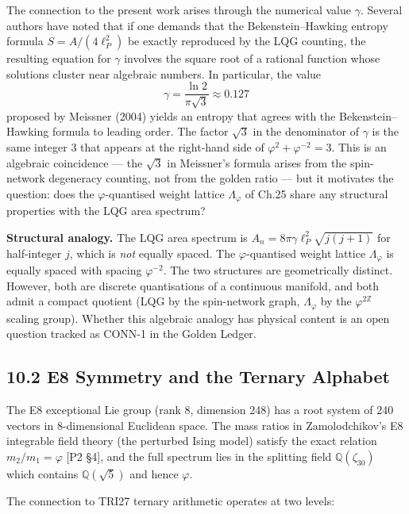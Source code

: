 The connection to the present work arises through the numerical value
$\gamma$. Several authors have noted that if one demands that the
Bekenstein--Hawking entropy formula $S = A/(4\ell_P^2)$ be exactly
reproduced by the LQG counting, the resulting equation for $\gamma$
involves the square root of a rational function whose solutions cluster
near algebraic numbers. In particular, the value
\[\gamma = \frac{\ln 2}{\pi\sqrt{3}} \approx 0.127\]
proposed by Meissner (2004) yields an entropy that agrees with the
Bekenstein--Hawking formula to leading order. The factor $\sqrt{3}$ in
the denominator of $\gamma$ is the same integer $3$ that appears at the
right-hand side of $\varphi^2 + \varphi^{-2} = 3$. This is an algebraic
coincidence --- the $\sqrt{3}$ in Meissner's formula arises from the
spin-network degeneracy counting, not from the golden ratio --- but it
motivates the question: does the $\varphi$-quantised weight lattice
$\Lambda_\varphi$ of Ch.25 share any structural properties with the LQG
area spectrum?

\textbf{Structural analogy.} The LQG area spectrum is
$A_n = 8\pi\gamma\ell_P^2 \sqrt{j(j+1)}$ for half-integer $j$, which
is \emph{not} equally spaced. The $\varphi$-quantised weight lattice
$\Lambda_\varphi$ is equally spaced with spacing $\varphi^{-2}$. The two
structures are geometrically distinct. However, both are discrete
quantisations of a continuous manifold, and both admit a compact quotient
(LQG by the spin-network graph, $\Lambda_\varphi$ by the
$\varphi^{2\mathbb{Z}}$ scaling group). Whether this algebraic analogy
has physical content is an open question tracked as CONN-1 in the Golden
Ledger.

\subsection{10.2 E8 Symmetry and the Ternary
Alphabet}\label{fa_27:sec:e8-connection}

The E8 exceptional Lie group (rank 8, dimension 248) has a root system
of 240 vectors in 8-dimensional Euclidean space. The mass ratios in
Zamolodchikov's E8 integrable field theory (the perturbed Ising model)
satisfy the exact relation $m_2/m_1 = \varphi$ [P2 §4], and the full
spectrum lies in the splitting field $\mathbb{Q}(\zeta_{30})$ which
contains $\mathbb{Q}(\sqrt{5})$ and hence $\varphi$.

The connection to TRI27 ternary arithmetic operates at two levels:

